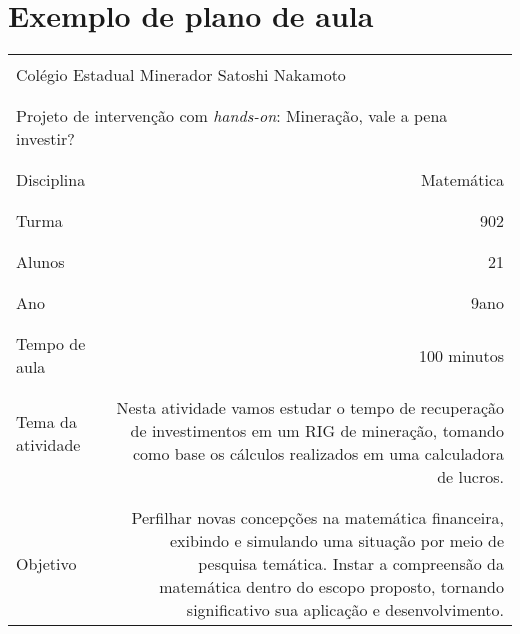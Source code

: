   
 

\section{Exemplo de plano de aula} 


\begin{table}[H]
	\centering
\begin{tabular}{|l|r|}
	\hline
	\multicolumn{2}{|l|}{} \\
	\multicolumn{2}{|l|}{Colégio Estadual Minerador Satoshi Nakamoto} \\
	\multicolumn{2}{|l|}{} \\
	\hline
	\multicolumn{2}{|l|}{} \\
	\multicolumn{2}{|l|}{Projeto de intervenção com \textit{hands-on}: Mineração, vale a pena investir?} \\
	\multicolumn{2}{|l|}{} \\
	\hline
	& \\
	Disciplina & Matemática \\
	& \\
	\hline
	& \\
	Turma & 902 \\
	& \\
	\hline
	& \\
	Alunos & 21 \\
	& \\
	\hline
	& \\
	Ano & 9\textdegree ano \\
	& \\
	\hline
	& \\
	Tempo de aula & 100 minutos \\
	& \\
	\hline
	& \\
	Tema da atividade & \multirow{3}{11cm}{Nesta atividade vamos estudar o tempo de recuperação de investimentos em um RIG \index{RIG} de mineração, tomando como base os cálculos realizados em uma calculadora de lucros.} \\	
	& \\	
	& \\	
	& \\	
	\hline
	& \\
	Objetivo & \multirow{4}{11cm}{Perfilhar novas concepções na matemática financeira, exibindo e simulando uma situação por meio de pesquisa temática. Instar a compreensão da  matemática dentro do escopo proposto, tornando significativo sua aplicação e desenvolvimento.}  \\

\end{tabular}
\end{table}
